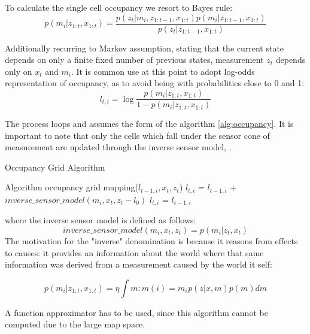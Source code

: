 To calculate the single cell occupancy we resort to Bayes rule:
\begin{equation}
    p(m_{i} | z_{1:t},x_{1:t}) = \frac{p(z_{t} | m_{i},z_{1:t-1},x_{1:t}) p(m_{i} | z_{1:t-1},x_{1:t})}{p(z_{t} |z_{1:t-1},x_{1:t})}
\end{equation}

Additionally recurring to Markov assumption, stating that the current state depends on only a finite fixed number of previous states, measurement $z_{t}$ depends only on $x_{t}$ and $m_{i}$.
It is common use at this point to adopt log-odds representation of occupancy, as to avoid being with probabilities close to 0 and 1:
\begin{equation}
    l_{t,i} = \log{\frac{p(m_{i} | z_{1:t},x_{1:t})}{1 - p(m_{i} | z_{1:t},x_{1:t})}}
\end{equation}

The process loops and assumes the form of the algorithm \ref{alg:occupancy}.
It is important to note that only the cells which fall under the sensor cone of measurement are updated through the inverse sensor model, \citet{thrun2005probabilistic}.
\begin{algorithm}
\caption{Occupancy Grid Algorithm}\label{alg:occupancy}
\begin{algorithmic}
\STATE Algorithm occupancy grid mapping({$l_{t-1,i},x_{t},z_{t}$})
        \STATE $l_{t,i}$ = $l_{t-1,i}$ + $inverse\_sensor\_model(m_{i},x_{t},z_{t} - l_{0})$
    \ELSE
        \STATE $l_{t,i}$ = $l_{t-1,i}$
    \ENDIF
\ENDFOR
{}
\end{algorithmic}
\end{algorithm}

where the inverse sensor model is defined as follows:
\begin{equation}
    inverse\_sensor\_model(m_{i},x_{t},z_{t}) = p(m_{i}|z_{t}, x_{t})
\end{equation}
The motivation for the "inverse" denomination is because it reasons from effects to causes: it provides an information about the world where that same information was derived from a measurement caused by the world it self:

\begin{equation}
    p(m_{i} | z_{1:t},x_{1:t}) = \eta \int{m:m(i)=m_{i}}^{} p(z | x,m) p(m) dm
\end{equation}

A function approximator has to be used, since this algorithm cannot be computed due to the large map space.


